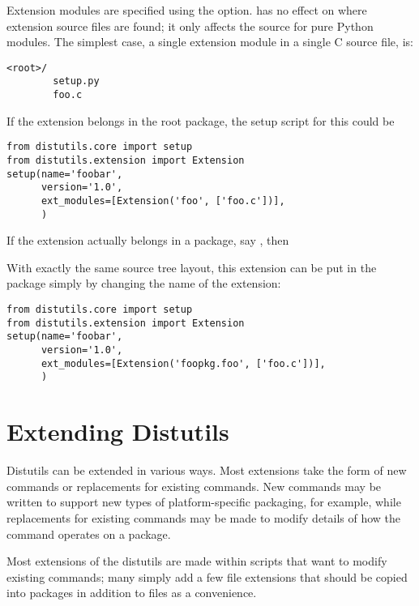 \documentclass{manual}
\begin{document}
Extension modules are specified using the  option.
 has no effect on where extension source files are
found; it only affects the source for pure Python modules.  The simplest 
case, a single extension module in a single C source file, is:
\begin{verbatim}
<root>/
        setup.py
        foo.c
\end{verbatim}
If the  extension belongs in the root package, the setup
script for this could be
\begin{verbatim}
from distutils.core import setup
from distutils.extension import Extension
setup(name='foobar',
      version='1.0',
      ext_modules=[Extension('foo', ['foo.c'])],
      )
\end{verbatim}

If the extension actually belongs in a package, say ,
then 

With exactly the same source tree layout, this extension can be put in
the  package simply by changing the name of the
extension:
\begin{verbatim}
from distutils.core import setup
from distutils.extension import Extension
setup(name='foobar',
      version='1.0',
      ext_modules=[Extension('foopkg.foo', ['foo.c'])],
      )
\end{verbatim}






\chapter{Extending Distutils \label{extending}}

Distutils can be extended in various ways.  Most extensions take the
form of new commands or replacements for existing commands.  New
commands may be written to support new types of platform-specific
packaging, for example, while replacements for existing commands may
be made to modify details of how the command operates on a package.

Most extensions of the distutils are made within 
scripts that want to modify existing commands; many simply add a few
file extensions that should be copied into packages in addition to
 files as a convenience.
\end{document}
